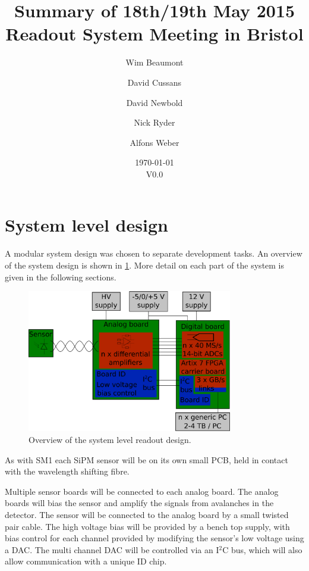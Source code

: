 \documentclass[a4paper]{article}
\title{Summary of 18th/19th May 2015 Readout System Meeting in Bristol}
\author[1]{Wim Beaumont}
\author[2]{David Cussans}
\author[2]{David Newbold}
\author[3]{Nick Ryder}
\author[3]{Alfons Weber}
\affil[1]{Universiteit Antwerpen}
\affil[2]{University of Bristol}
\affil[3]{University of Oxford}
\date{\today\\V0.0}
\begin{document}
\maketitle


\tableofcontents

\section{System level design}

A modular system design was chosen to separate development tasks.
An overview of the system design is shown in \cref{systemoverview}.
More detail on each part of the system is given in the following sections.

\begin{figure}[htp]
    \begin{center}
        \includegraphics[width=0.8\textwidth]{imgs/overview}
        \caption{Overview of the system level readout design.}
        \label{systemoverview}
    \end{center}
\end{figure}

As with SM1 each SiPM sensor will be on its own small PCB, held in contact with the wavelength shifting fibre.

Multiple sensor boards will be connected to each analog board.
The analog boards will bias the sensor and amplify the signals from avalanches in the detector.
The sensor will be connected to the analog board by a small twisted pair cable.
The high voltage bias will be provided by a bench top supply, with bias control for each channel provided by modifying the sensor's low voltage using a DAC.
The multi channel DAC will be controlled via an I$^2$C bus, which will also allow communication with a unique ID chip.
\end{document}
